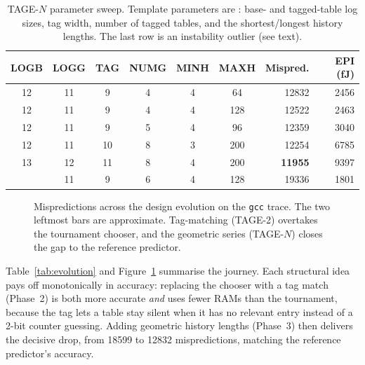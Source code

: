 \documentclass[11pt]{article}
\newcommand{\code}[1]{\texttt{\small #1}}
\begin{document}
\begin{table}[t]
\centering
\caption{TAGE-$N$ parameter sweep. Template parameters are
\code{<LOGB, LOGG, TAGBITS, NUMG, MINHIST, MAXHIST>}: base- and tagged-table log
sizes, tag width, number of tagged tables, and the shortest/longest history
lengths. The last row is an instability outlier (see text).}
\label{tab:sweep}
\small
\begin{tabular}{cccccc rr}
\toprule
LOGB & LOGG & TAG & NUMG & MINH & MAXH & Mispred. & EPI (fJ) \\
\midrule
12 & 11 &  9 & 4 & 4 &  64 & \num{12832} & \num{2456} \\
12 & 11 &  9 & 4 & 4 & 128 & \num{12522} & \num{2463} \\
12 & 11 &  9 & 5 & 4 &  96 & \num{12359} & \num{3040} \\
12 & 11 & 10 & 8 & 3 & 200 & \num{12254} & \num{6785} \\
13 & 12 & 11 & 8 & 4 & 200 & \textbf{\num{11955}} & \num{9397} \\
\addlinespace
12 & 11 &  9 & 6 & 4 & 128 & \num{19336} & \num{1801} \\
\bottomrule
\end{tabular}
\end{table}

\begin{figure}[t]
\centering
{}
\caption{Mispredictions across the design evolution on the \code{gcc} trace.
The two leftmost bars are approximate. Tag-matching (TAGE-2) overtakes the
tournament chooser, and the geometric series (TAGE-$N$) closes the gap to the
reference predictor.}
\label{fig:evolution}
\end{figure}

Table~\ref{tab:evolution} and Figure~\ref{fig:evolution} summarise the journey.
Each structural idea pays off monotonically in accuracy: replacing the chooser
with a tag match (Phase~2) is both more accurate \emph{and} uses fewer RAMs than
the tournament, because the tag lets a table stay silent when it has no relevant
entry instead of a 2-bit counter guessing. Adding geometric history lengths
(Phase~3) then delivers the decisive drop, from \num{18599} to \num{12832}
mispredictions, matching the reference predictor's accuracy.
\end{document}
